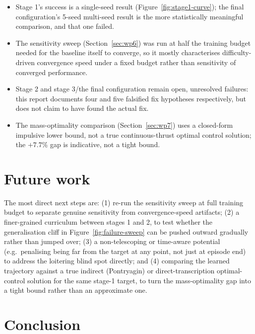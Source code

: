 \begin{itemize}
  \item Stage 1's success is a single-seed result (Figure~\ref{fig:stage1-curve}); the final
        configuration's 5-seed multi-seed result is the more statistically meaningful comparison,
        and that one failed.
  \item The sensitivity sweep (Section~\ref{sec:wp6}) was run at half the training budget needed
        for the baseline itself to converge, so it mostly characterises difficulty-driven
        convergence speed under a fixed budget rather than sensitivity of converged performance.
  \item Stage 2 and stage 3/the final configuration remain open, unresolved failures: this report
        documents four and five falsified fix hypotheses respectively, but does not claim to have
        found the actual fix.
  \item The mass-optimality comparison (Section~\ref{sec:wp7}) uses a closed-form impulsive lower
        bound, not a true continuous-thrust optimal control solution; the $+7.7\%$ gap is
        indicative, not a tight bound.
\end{itemize}

\section{Future work}

The most direct next steps are: (1) re-run the sensitivity sweep at full training budget to
separate genuine sensitivity from convergence-speed artifacts; (2) a finer-grained curriculum
between stages 1 and 2, to test whether the generalisation cliff in
Figure~\ref{fig:failure-sweep} can be pushed outward gradually rather than jumped over; (3) a
non-telescoping or time-aware potential (e.g.\ penalising being far from the target at any point,
not just at episode end) to address the loitering blind spot directly; and (4) comparing the
learned trajectory against a true indirect (Pontryagin) or direct-transcription optimal-control
solution for the same stage-1 target, to turn the mass-optimality gap into a tight bound rather
than an approximate one.

\section{Conclusion}

